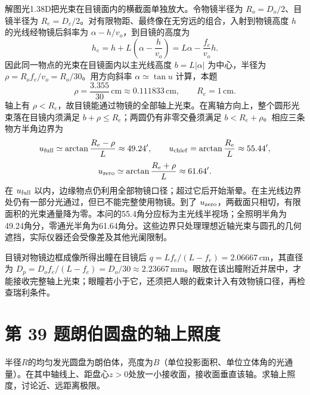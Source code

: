 \documentclass[UTF8,fontset=fandol,a4paper,11pt]{ctexart}
\newcommand{\figcaption}[1]{\par\vspace{2pt}{\small\color{muted}#1}\par}
\begin{document}
解图光1.38D把光束在目镜面内的横截面单独放大。令物镜半径为 $R_o=D_o/2$、目镜半径为 $R_e=D_e/2$。对有限物距、最终像在无穷远的组合，入射到物镜高度 $h$ 的光线经物镜后斜率为 $\alpha-h/v_o$，到目镜的高度为
\[
h_e=h+L\left(\alpha-\frac{h}{v_o}\right)
=L\alpha-\frac{f_e}{v_o}h.
\]
因此同一物点的光束在目镜面内以主光线高度 $b=L|\alpha|$ 为中心，半径为 $\rho=R_of_e/v_o=R_o/30$。用方向斜率 $\alpha\simeq\tan u$ 计算，本题
\[
\rho=\frac{3.355}{30}\,\mathrm{cm}
\approx0.111833\,\mathrm{cm},\qquad R_e=1\,\mathrm{cm}.
\]
轴上有 $\rho<R_e$，故目镜能通过物镜的全部轴上光束。在离轴方向上，整个圆形光束落在目镜内须满足 $b+\rho\le R_e$；两圆仍有非零交叠须满足 $b<R_e+\rho$。相应三条物方半角边界为
\[
u_{\rm full}\simeq\arctan\frac{R_e-\rho}{L}
\approx49.24',\qquad
u_{\rm chief}=\arctan\frac{R_e}{L}\approx55.44',
\]
\[
u_{\rm zero}\simeq\arctan\frac{R_e+\rho}{L}
\approx61.64'.
\]
在 $u_{\rm full}$ 以内，边缘物点仍利用全部物镜口径；超过它后开始渐晕。在主光线边界处仍有一部分光通过，但已不能完整使用物镜。到了 $u_{\rm zero}$，两截面只相切，有限面积的光束通量降为零。本问的55.4角分应标为主光线半视场；全照明半角为49.24角分，零通光半角为61.64角分。这些边界只处理理想近轴光束与圆孔的几何遮挡，实际仪器还会受像差及其他光阑限制。

目镜对物镜边框成像所得出瞳在目镜后 $q=Lf_e/(L-f_e)=2.06667\,\mathrm{cm}$，其直径为 $D_p=D_of_e/(L-f_e)=D_o/30\approx2.23667\,\mathrm{mm}$。眼放在该出瞳附近并居中，才能接收完整轴上光束；眼瞳若小于它，还须把人眼的截束计入有效物镜口径，再检查瑞利条件。




\section*{第 39 题\quad 朗伯圆盘的轴上照度}\label{q:39}

半径$R$的均匀发光圆盘为朗伯体，亮度为$B$（单位投影面积、单位立体角的光通量）。在其中轴线上、距盘心$z>0$处放一小接收面，接收面垂直该轴。求轴上照度，讨论近、远距离极限。

\begin{center}\begin{minipage}{.98\linewidth}\centering
{}
\figcaption{图光1.39\quad 有限发光圆盘与轴上垂直接收面}
\end{minipage}\end{center}
\end{document}
